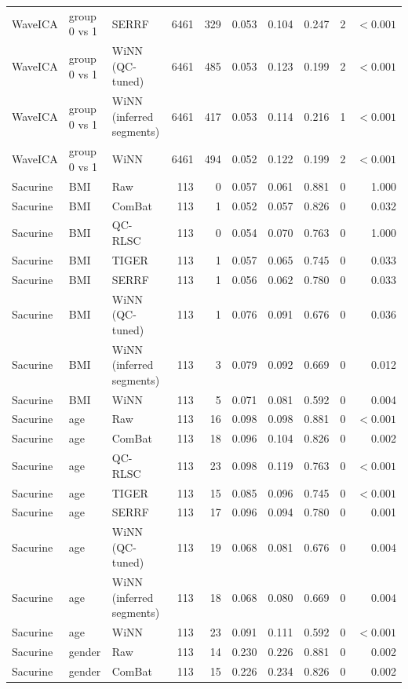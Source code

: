 \begin{landscape}
\begin{longtable}{lllrrrrrrr}
WaveICA & group 0 vs 1 & SERRF & 6461 & 329 & 0.053 & 0.104 & 0.247 & 2 & $<0.001$ \\
WaveICA & group 0 vs 1 & WiNN (QC-tuned) & 6461 & 485 & 0.053 & 0.123 & 0.199 & 2 & $<0.001$ \\
WaveICA & group 0 vs 1 & WiNN (inferred segments) & 6461 & 417 & 0.053 & 0.114 & 0.216 & 1 & $<0.001$ \\
WaveICA & group 0 vs 1 & WiNN & 6461 & 494 & 0.052 & 0.122 & 0.199 & 2 & $<0.001$ \\
Sacurine & BMI & Raw & 113 & 0 & 0.057 & 0.061 & 0.881 & 0 & 1.000 \\
Sacurine & BMI & ComBat & 113 & 1 & 0.052 & 0.057 & 0.826 & 0 & 0.032 \\
Sacurine & BMI & QC-RLSC & 113 & 0 & 0.054 & 0.070 & 0.763 & 0 & 1.000 \\
Sacurine & BMI & TIGER & 113 & 1 & 0.057 & 0.065 & 0.745 & 0 & 0.033 \\
Sacurine & BMI & SERRF & 113 & 1 & 0.056 & 0.062 & 0.780 & 0 & 0.033 \\
Sacurine & BMI & WiNN (QC-tuned) & 113 & 1 & 0.076 & 0.091 & 0.676 & 0 & 0.036 \\
Sacurine & BMI & WiNN (inferred segments) & 113 & 3 & 0.079 & 0.092 & 0.669 & 0 & 0.012 \\
Sacurine & BMI & WiNN & 113 & 5 & 0.071 & 0.081 & 0.592 & 0 & 0.004 \\
Sacurine & age & Raw & 113 & 16 & 0.098 & 0.098 & 0.881 & 0 & $<0.001$ \\
Sacurine & age & ComBat & 113 & 18 & 0.096 & 0.104 & 0.826 & 0 & 0.002 \\
Sacurine & age & QC-RLSC & 113 & 23 & 0.098 & 0.119 & 0.763 & 0 & $<0.001$ \\
Sacurine & age & TIGER & 113 & 15 & 0.085 & 0.096 & 0.745 & 0 & $<0.001$ \\
Sacurine & age & SERRF & 113 & 17 & 0.096 & 0.094 & 0.780 & 0 & 0.001 \\
Sacurine & age & WiNN (QC-tuned) & 113 & 19 & 0.068 & 0.081 & 0.676 & 0 & 0.004 \\
Sacurine & age & WiNN (inferred segments) & 113 & 18 & 0.068 & 0.080 & 0.669 & 0 & 0.004 \\
Sacurine & age & WiNN & 113 & 23 & 0.091 & 0.111 & 0.592 & 0 & $<0.001$ \\
Sacurine & gender & Raw & 113 & 14 & 0.230 & 0.226 & 0.881 & 0 & 0.002 \\
Sacurine & gender & ComBat & 113 & 15 & 0.226 & 0.234 & 0.826 & 0 & 0.002 \\

\end{longtable}
\end{landscape}

